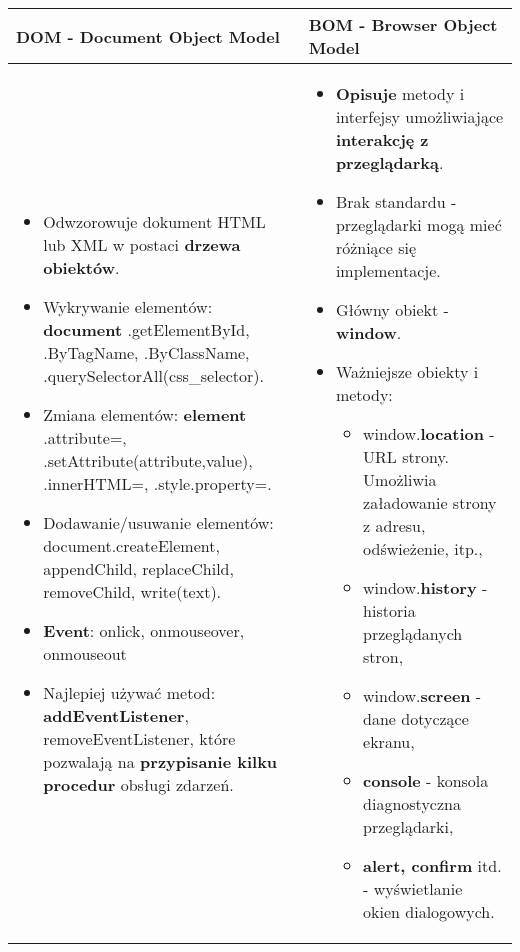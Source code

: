 \documentclass[../main.tex]{subfiles}
\begin{document}
    \begin{table}[H]
        \begin{center}
            \begin{tabular}{| p{8cm} | p{8cm}| }
                \hline
                \textbf{DOM} - Document Object Model &  \textbf{BOM} - Browser Object Model\\
                \hline
                \hline
                \begin{itemize}
                    \item Odwzorowuje dokument HTML lub XML w postaci \textbf{drzewa obiektów}.
                    \item Wykrywanie elementów: \textbf{document} .getElementById, .ByTagName, .ByClassName, .querySelectorAll(css\_selector).
                    \item Zmiana elementów: \textbf{element} .attribute=, .setAttribute(attribute,value), .innerHTML=, .style.property=.
                    \item Dodawanie/usuwanie elementów: document.createElement, appendChild, replaceChild, removeChild, write(text).
                    \item \textbf{Event}: onlick, onmouseover, onmouseout
                    \item Najlepiej używać metod: \textbf{addEventListener}, removeEventListener, które pozwalają na \textbf{przypisanie kilku procedur} obsługi zdarzeń.
                \end{itemize}
                &
                \begin{itemize}
                    \item \textbf{Opisuje} metody i interfejsy umożliwiające \textbf{interakcję z przeglądarką}.
                    \item Brak standardu - przeglądarki mogą mieć różniące się implementacje.
                    \item Główny obiekt - \textbf{window}.
                    \item Ważniejsze obiekty i metody:
                    \begin{itemize}
                        \item window.\textbf{location} - URL strony. Umożliwia załadowanie strony z adresu, odświeżenie, itp.,
                        \item window.\textbf{history} - historia przeglądanych stron,
                        \item window.\textbf{screen} - dane dotyczące ekranu,
                        \item \textbf{console} - konsola diagnostyczna przeglądarki,
                        \item \textbf{alert, confirm} itd. - wyświetlanie okien dialogowych.
                    \end{itemize}
                \end{itemize}\\
                \hline
            \end{tabular}
        \end{center}
    \end{table}
\end{document}
